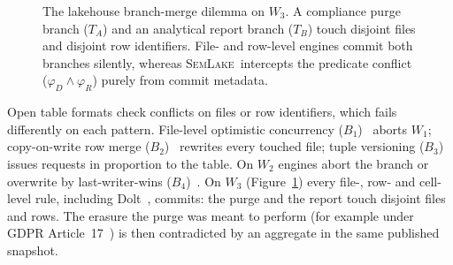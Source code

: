 \documentclass[sigconf, nonacm]{acmart}
\newcommand{\systemname}{\textsc{SemLake}}
\begin{document}
\begin{figure}[t]
\caption{The lakehouse branch-merge dilemma on $W_3$. A compliance purge branch ($T_A$) and an analytical report branch ($T_B$) touch disjoint files and disjoint row identifiers. File- and row-level engines commit both branches silently, whereas \systemname\ intercepts the predicate conflict ($\varphi_D \land \varphi_R$) purely from commit metadata.}
\label{fig:motivating}
\end{figure}

Open table formats check conflicts on files or row identifiers, which fails differently on each pattern. File-level optimistic concurrency ($B_1$)~\cite{armbrust2020delta} aborts $W_1$; copy-on-write row merge ($B_2$)~\cite{tagliabue2024bauplan} rewrites every touched file; tuple versioning ($B_3$)~\cite{maddox2016decibel, huang2017orpheusdb} issues requests in proportion to the table. On $W_2$ engines abort the branch or overwrite by last-writer-wins ($B_4$)~\cite{faria2025crdv}. On $W_3$ (Figure~\ref{fig:motivating}) every file-, row- and cell-level rule, including Dolt~\cite{dolt2026}, commits: the purge and the report touch disjoint files and rows. The erasure the purge was meant to perform (for example under GDPR Article~17~\cite{gdpr2016}) is then contradicted by an aggregate in the same published snapshot.
\end{document}
